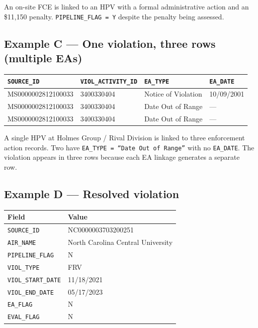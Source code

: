 \documentclass[11pt]{article}
\begin{document}
\noindent An on-site FCE is linked to an HPV with a formal administrative action and an \$11,150 penalty. \texttt{PIPELINE\_FLAG = Y} despite the penalty being assessed.

\subsection*{Example C --- One violation, three rows (multiple EAs)}

\begin{table}[H]
\centering
\begin{tabular}{llll}
\toprule
\texttt{SOURCE\_ID} & \texttt{VIOL\_ACTIVITY\_ID} & \texttt{EA\_TYPE} & \texttt{EA\_DATE} \\
\midrule
MS0000002812100033 & 3400330404 & Notice of Violation & 10/09/2001 \\
MS0000002812100033 & 3400330404 & Date Out of Range & --- \\
MS0000002812100033 & 3400330404 & Date Out of Range & --- \\
\bottomrule
\end{tabular}
\end{table}

\noindent A single HPV at Holmes Group / Rival Division is linked to three enforcement action records. Two have \texttt{EA\_TYPE = ``Date Out of Range''} with no \texttt{EA\_DATE}. The violation appears in three rows because each EA linkage generates a separate row.

\subsection*{Example D --- Resolved violation}

\begin{table}[H]
\centering
\begin{tabular}{ll}
\toprule
Field & Value \\
\midrule
\texttt{SOURCE\_ID} & NC0000003703200251 \\
\texttt{AIR\_NAME} & North Carolina Central University \\
\texttt{PIPELINE\_FLAG} & N \\
\texttt{VIOL\_TYPE} & FRV \\
\texttt{VIOL\_START\_DATE} & 11/18/2021 \\
\texttt{VIOL\_END\_DATE} & 05/17/2023 \\
\texttt{EA\_FLAG} & N \\
\texttt{EVAL\_FLAG} & N \\
\bottomrule
\end{tabular}
\end{table}
\end{document}

